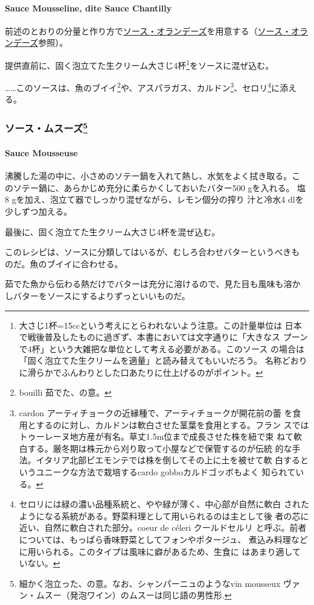 \begin{recette}
\hypertarget{sauce-mousseline}{%
\paragraph{Sauce Mousseline, dite Sauce
Chantilly}\label{sauce-mousseline}}

前述のとおりの分量と作り方で\protect\hyperlink{sauce-hollandaise}{ソース・オランデーズ}を用意する（\protect\hyperlink{sauce-hollandaise}{ソース・オランデーズ}参照）。

提供直前に、固く泡立てた生クリーム大さじ4杯\footnote{大さじ1杯=15ccという考えにとらわれないよう注意。この計量単位は
  日本で戦後普及したものに過ぎず、本書においては文字通りに「大きなス
  プーンで4杯」という大雑把な単位として考える必要がある。このソース
  の場合は「固く泡立てた生クリームを適量」と読み替えてもいいだろう。
  名称どおりに滑らかでふんわりとした口あたりに仕上げるのがポイント。}をソースに混ぜ込む。

\ldots{}\ldots{}このソースは、魚のブイイ\footnote{bouilli 茹でた、の意。}や、アスパラガス、カルドン\footnote{cardon
  アーティチョークの近縁種で、アーティチョークが開花前の蕾
  を食用とするのに対し、カルドンは軟白させた茎葉を食用とする。フラン
  スではトゥーレーヌ地方産が有名。草丈1.5m位まで成長させた株を紐で束
  ねて軟白する。厳冬期は株元から刈り取って小屋などで保管するのが伝統
  的な手法。イタリア北部ピエモンテでは株を倒してその上に土を被せて軟
  白するというユニークな方法で栽培するcardo gobboカルドゴッボもよく
  知られている。}、セロリ\footnote{セロリには緑の濃い品種系統と、やや緑が薄く、中心部が自然に軟白
  されたようになる系統がある。野菜料理として用いられるのは主として後
  者の芯に近い、自然に軟白された部分。coeur de céleri クールドセルリ
  と呼ぶ。前者については、もっぱら香味野菜としてフォンやポタージュ、
  煮込み料理などに用いられる。このタイプは風味に癖があるため、生食に
  はあまり適していない。}に添える。

\maeaki

\hypertarget{ux30bdux30fcux30b9ux30e0ux30b9ux30fcux30ba90}{%
\subsubsection[ソース・ムスーズ]{\texorpdfstring{ソース・ムスーズ\footnote{細かく泡立った、の意。なお、シャンパーニュのようなvin
  mousseux ヴァン・ムスー（発泡ワイン）のムスーは同じ語の男性形.}}{ソース・ムスーズ}}\label{ux30bdux30fcux30b9ux30e0ux30b9ux30fcux30ba90}}

\hypertarget{sauce-mousseuse}{%
\paragraph{Sauce Mousseuse}\label{sauce-mousseuse}}

沸騰した湯の中に、小さめのソテー鍋を入れて熱し、水気をよく拭き取る。こ
のソテー鍋に、あらかじめ充分に柔らかくしておいたバター500 gを入れる。
塩8 gを加え、泡立て器でしっかり混ぜながら、レモン\unquart{}個分の搾り
汁と冷水4 dlを少しずつ加える。

最後に、固く泡立てた生クリーム大さじ4杯を混ぜ込む。

このレシピは、ソースに分類してはいるが、むしろ合わせバターというべきも
のだ。魚のブイイに合わせる。

茹でた魚から伝わる熱だけでバターは充分に溶けるので、見た目も風味も溶か
しバターをソースにするよりずっといいものだ。
\end{recette}